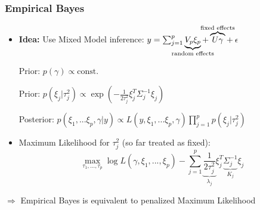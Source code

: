 \documentclass[final]{beamer}
\begin{document}
\begin{frame}
\frametitle{Empirical Bayes}

\begin{itemize}
\item \textcolor{beamer@postercolour}{\textbf{Idea:}} Use Mixed Model inference: $y = \sum_{j=1}^p \underbrace{V_p \xi_p}_{\mathclap{\text{random effects}}} + \overbrace{U \gamma}^{\mathclap{\text{fixed effects}}} + \: \epsilon$ \pause
\vspace{1em}


\textcolor{beamer@postercolour}{Prior: } $ p(\gamma) \propto \text{const.}$ \pause

\textcolor{beamer@postercolour}{Prior: }  $p(\xi_j|\tau_j^2)  \propto \exp\left(-\frac{1}{2\tau^2_j} \xi_j^T\Sigma^{-1}_j \xi_j\right) $  \pause

\textcolor{beamer@postercolour}{Posterior: }
$p(\xi_1, ... \xi_p, \gamma|y) \propto L(y,\xi_1, ... \xi_p, \gamma)\prod_{j=1}^p p(\xi_j|\tau_j^2) $ \pause
\vspace{1em}

\item Maximum Likelihood for $\tau_j^2$ (so far treated as fixed):
$$\max_{\tau_1, ..., \tau_p} \log L(\gamma, \xi_1,...,\xi_p) - \sum_{j=1}^p \underbrace{\frac{1}{2\tau^2_j}}_{\lambda_j} \xi_j^T \underbrace{\Sigma^{-1}_j}_{K_j} \xi_j$$
\end{itemize}

\pause

$\Rightarrow$ Empirical Bayes is equivalent to penalized Maximum Likelihood


\end{frame}
\end{document}
